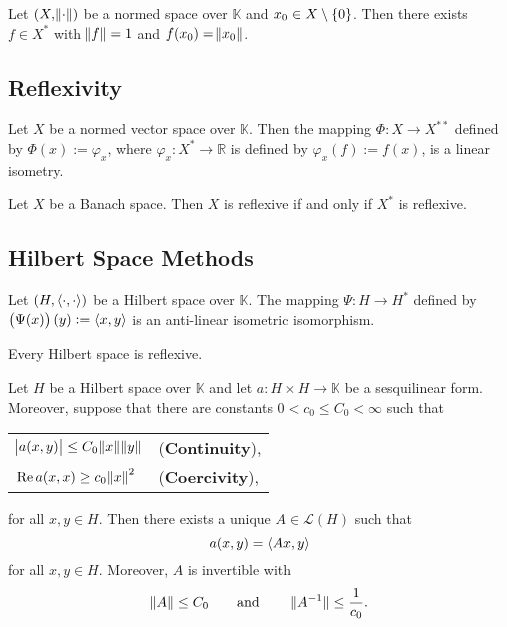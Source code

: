 \begin{corollary}[Separation]
	Let $(X,\norm{\cdot})$ be a normed space over $\mathbb{K}$ and $x_0 \in X \setminus \cbr{0}$. Then there exists $f \in X^*$ with $\norm{f} = 1$ and $f(x_0) = \norm{x_0}$.
\end{corollary}

\subsection{Reflexivity}

\begin{proposition}
	Let $X$ be a normed vector space over $\mathbb{K}$. Then the mapping $\Phi : X \to X^{**}$ defined by $\Phi(x) := \varphi_x$, where $\varphi_x : X^* \to \mathbb{R}$ is defined by $\varphi_x(f) := f(x)$, is a linear isometry.
\end{proposition}

\begin{theorem}
	Let $X$ be a Banach space. Then $X$ is reflexive if and only if $X^*$ is reflexive.
\end{theorem}

\subsection{Hilbert Space Methods}

\begin{theorem}
	Let $(H,\inprod{\cdot}{\cdot})$ be a Hilbert space over $\mathbb{K}$. The mapping $\Psi : H \to H^*$ defined by $\del[1]{\Psi(x)}(y) := \inprod{x}{y}$ is an anti-linear isometric isomorphism.
\end{theorem}

\begin{corollary}
	Every Hilbert space is reflexive.
\end{corollary}

\begin{theorem}
	Let $H$ be a Hilbert space over $\mathbb{K}$ and let $a : H \times H \to \mathbb{K}$ be a sesquilinear form. Moreover, suppose that there are constants $0 < c_0 \leq C_0 < \infty$ such that
	\begin{center}
		\begin{tabular}{ll}
			$\abs{a(x,y)} \leq C_0 \norm{x}\norm{y}$ & (\textbf{Continuity}),\\
			$\Re a(x,x) \geq c_0\norm{x}^2$ & (\textbf{Coercivity}),
		\end{tabular}
	\end{center}
	\noindent for all $x,y \in H$. Then there exists a unique $A \in \mathcal{L}(H)$ such that 
	\begin{equation}
		a(x,y) = \inprod{Ax}{y}
	\end{equation}
	\noindent for all $x,y \in H$. Moreover, $A$ is invertible with
	\begin{equation}
		\norm{A} \leq C_0 \qquad \text{and} \qquad \norm[0]{A^{-1}} \leq \frac{1}{c_0}.	
	\end{equation}
\end{theorem}
